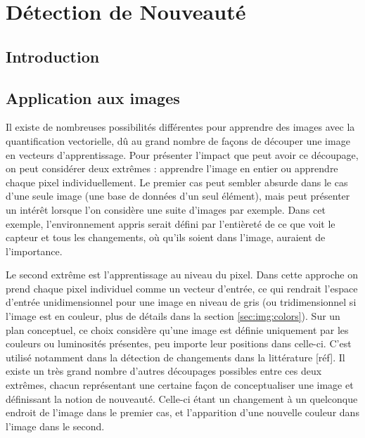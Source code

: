 
\chapter{Détection de Nouveauté}
	\minitoc
	\newpage




			
	\section{Introduction}

	\section{Application aux images}\label{sec:images}

	Il existe de nombreuses possibilités différentes pour apprendre des images avec la quantification vectorielle, dû au grand nombre de façons de découper une image en vecteurs d'apprentissage. Pour présenter l'impact que peut avoir ce découpage, on peut considérer deux extrêmes : apprendre l'image en entier ou apprendre chaque pixel individuellement. Le premier cas peut sembler absurde dans le cas d'une seule image (une base de données d'un seul élément), mais peut présenter un intérêt lorsque l'on considère une suite d'images par exemple. Dans cet exemple, l'environnement appris serait défini par l'entièreté de ce que voit le capteur et tous les changements, où qu'ils soient dans l'image, auraient de l'importance.

	Le second extrême est l'apprentissage au niveau du pixel. Dans cette approche on prend chaque pixel individuel comme un vecteur d'entrée, ce qui rendrait l'espace d'entrée unidimensionnel pour une image en niveau de gris (ou tridimensionnel si l'image est en couleur, plus de détails dans la section \ref{sec:img:colors}). Sur un plan conceptuel, ce choix considère qu'une image est définie uniquement par les couleurs ou luminosités présentes, peu importe leur positions dans celle-ci. C'est utilisé notamment dans la détection de changements dans la littérature [réf]. Il existe un très grand nombre d'autres découpages possibles entre ces deux extrêmes, chacun représentant une certaine façon de conceptualiser une image et définissant la notion de nouveauté. Celle-ci étant un changement à un quelconque endroit de l'image dans le premier cas, et l'apparition d'une nouvelle couleur dans l'image dans le second.

